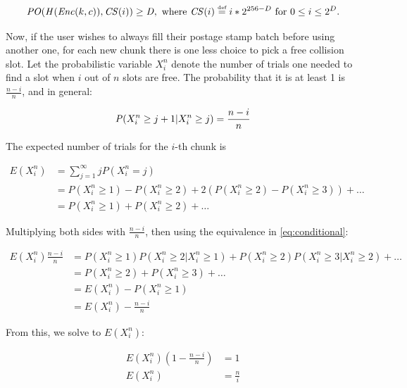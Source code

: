 \begin{equation}
\mathit{PO}(\mathit{H}(\mathit{Enc}(k, c)), \mathit{CS}(i))\geq\mathit{D},
\text{ where }\mathit{CS}(i)\overset{\textrm{\tiny def}}{=} i*2^{256-D}
\text{ for }0\leq i\leq  2^D.
\end{equation}

Now, if the user wishes to always fill their postage stamp batch before using another one, for each new chunk there is one less choice to pick a free collision slot. Let the probabilistic variable $X^n_i$ denote  the number of trials one needed to find a slot when $i$ out of $n$ slots are free. The probability that it is at least 1 is $\frac{n-i}{n}$, and in general:


\begin{equation}\label{eq:conditional}
\mathit{P}(X^n_i\geq j+1|X^n_i\geq j)=\frac{n-i}{n}\\
\end{equation}

The expected number of trials for the $i$-th chunk is 

 \begin{subequations}   \begin{align}
\mathit{E}(X^n_i)&=\sum^\infty_{j=1}j\mathit{P}(X^n_i=j)\\
&=\mathit{P}(X^n_i\geq 1)-\mathit{P}(X^n_i\geq 2)+2(\mathit{P}(X^n_i\geq 2)-P(X^n_i\geq 3))+\ldots\\
&= \mathit{P}(X^n_i\geq 1)+\mathit{P}(X^n_i\geq 2)+\ldots
\end{align} \end{subequations}

Multiplying both sides with $\frac{n-i}{n}$, then using  the equivalence in  \ref{eq:conditional}:

 \begin{subequations}   \begin{align}
\mathit{E}(X^n_i)\frac{n-i}{n}&=\mathit{P}(X^n_i\geq 1)\mathit{P}(X^n_i\geq 2|X^n_i\geq 1)+\mathit{P}(X^n_i\geq 2)\mathit{P}(X^n_i\geq 3|X^n_i\geq 2)+\ldots\\
&=\mathit{P}(X^n_i\geq 2)+\mathit{P}(X^n_i\geq 3)+\ldots\\
&=\mathit{E}(X^n_i)-\mathit{P}(X^n_i\geq 1)\\
&=\mathit{E}(X^n_i)-\frac{n-i}{n}
\end{align} \end{subequations}

From this, we solve to $\mathit{E}(X^n_i)$:

 \begin{subequations}   \begin{align}
\mathit{E}(X^n_i)(1-\frac{n-i}{n})&=1\\
\mathit{E}(X^n_i)&=\frac{n}{i}
\end{align} \end{subequations}

